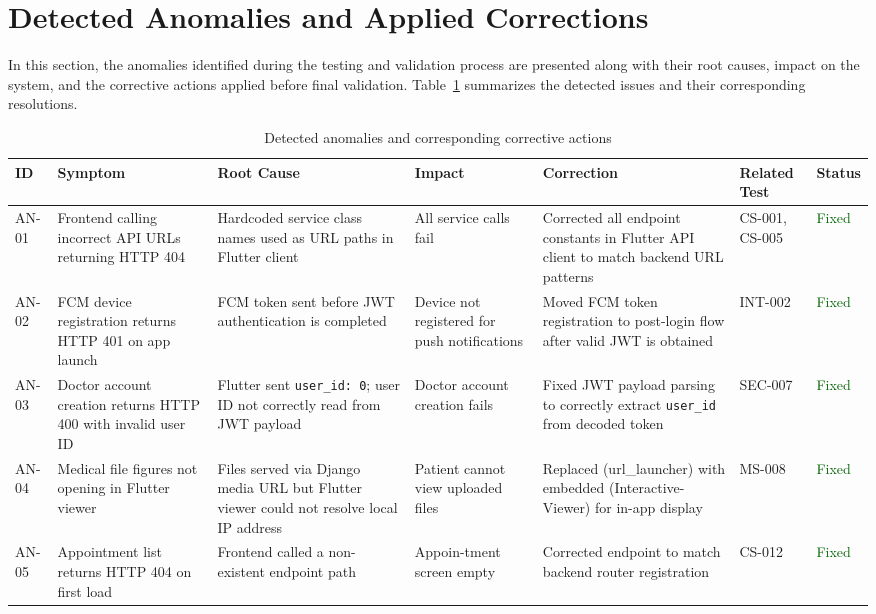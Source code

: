 \section{Detected Anomalies and Applied Corrections}
\label{sec:anomalies}
In this section, the anomalies identified during the testing and validation process are presented along with their root causes, impact on the system, and the corrective actions applied before final validation. Table~\ref{anomalies} summarizes the detected issues and their corresponding resolutions.

\begin{table}[H]
\centering
\caption{Detected anomalies and corresponding corrective actions}
\label{anomalies}
\renewcommand{\arraystretch}{1.4}
\begin{tabular}{|p{0.8cm}|p{2.2cm}|p{2cm}|p{1.7cm}|p{2.3cm}|p{1.5cm}|p{1.2cm}|}
\hline
\textbf{ID} & \textbf{Symptom} & \textbf{Root Cause} & \textbf{Impact} & \textbf{Correction} & \textbf{Related Test} & \textbf{Status} \\
\hline
AN-01 & Frontend calling incorrect API URLs returning HTTP 404 & Hardcoded service class names used as URL paths in Flutter client & All service calls fail & Corrected all endpoint constants in Flutter API client to match backend URL patterns & CS-001, CS-005 & \textcolor{darkgreen}{Fixed} \\
\hline
AN-02 & FCM device registration returns HTTP 401 on app launch & FCM token sent before JWT authentication is completed & Device not registered for push notifications & Moved FCM token registration to post-login flow after valid JWT is obtained & INT-002 & \textcolor{darkgreen}{Fixed} \\
\hline
AN-03 & Doctor account creation returns HTTP 400 with invalid user ID & Flutter sent \texttt{user\_id: 0}; user ID not correctly read from JWT payload & Doctor account creation fails & Fixed JWT payload parsing to correctly extract \texttt{user\_id} from decoded token & SEC-007 & \textcolor{darkgreen}{Fixed} \\
\hline
AN-04 & Medical file figures not opening in Flutter viewer & Files served via Django media URL but Flutter viewer could not resolve local IP address & Patient cannot view uploaded files & Replaced (url\_launcher) with embedded (Interactive-Viewer) for in-app display & MS-008 & \textcolor{darkgreen}{Fixed} \\
\hline
AN-05 & Appointment list returns HTTP 404 on first load & Frontend called a non-existent endpoint path & Appoin-tment screen empty & Corrected endpoint to match backend router registration & CS-012 & \textcolor{darkgreen}{Fixed} \\
\hline
\end{tabular}
\end{table}


